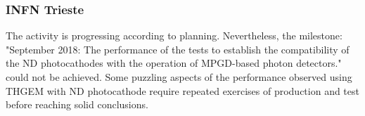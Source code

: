 \subsubsection{INFN Trieste} 
The activity is progressing according to  planning.
Nevertheless, the milestone: "September 2018: 
The performance of the tests to establish 
the compatibility of the ND photocathodes
with the operation of MPGD-based photon detectors."
could not be achieved. Some puzzling aspects 
of the performance observed using THGEM
with ND photocathode require repeated exercises
of production and test before reaching solid conclusions.